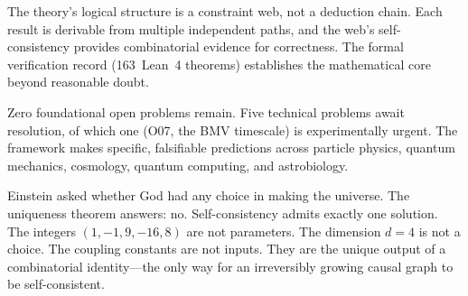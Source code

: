 \documentclass[11pt,a4paper]{article}
\theoremstyle{plain}
\theoremstyle{definition}
\theoremstyle{remark}
\begin{document}
The theory's logical structure is a constraint web, not a deduction chain.  Each
result is derivable from multiple independent paths, and the web's
self-consistency provides combinatorial evidence for correctness.  The formal
verification record (163~Lean~4 theorems) establishes the mathematical core
beyond reasonable doubt.

Zero foundational open problems remain.  Five technical problems await
resolution, of which one (O07, the BMV timescale) is experimentally urgent.  The
framework makes specific, falsifiable predictions across particle physics,
quantum mechanics, cosmology, quantum computing, and astrobiology.

Einstein asked whether God had any choice in making the universe.  The
uniqueness theorem answers: no.  Self-consistency admits exactly one solution.
The integers $(1,-1,9,-16,8)$ are not parameters.  The dimension $d = 4$ is not
a choice.  The coupling constants are not inputs.  They are the unique output of
a combinatorial identity---the only way for an irreversibly growing causal graph
to be self-consistent.
\end{document}
